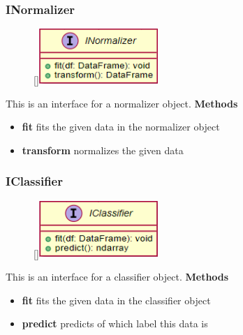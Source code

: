\subsubsection{INormalizer}
\label{INormalizer}
\begin{figure}
    \raisebox{0pt}[\dimexpr{}\baselineskip\relax]{\includegraphics[width=4.5cm]{classes/model-management/10.png}}
\end{figure} 
\par
This is an interface for a normalizer object.
\newline
\newline
\textbf{Methods}
\begin{itemize}
    \item \textbf{fit} fits the given data in the normalizer object
    \item \textbf{transform} normalizes the given data
\end{itemize}

\subsubsection{IClassifier}
\label{IClassifier}
\begin{figure}
    \raisebox{0pt}[\dimexpr{}\baselineskip\relax]{\includegraphics[width=4.5cm]{classes/model-management/11.png}}
\end{figure} 
\par
This is an interface for a classifier object.
\newline
\newline
\textbf{Methods}
\begin{itemize}
    \item \textbf{fit} fits the given data in the classifier object
    \item \textbf{predict} predicts of which label this data is
\end{itemize}

